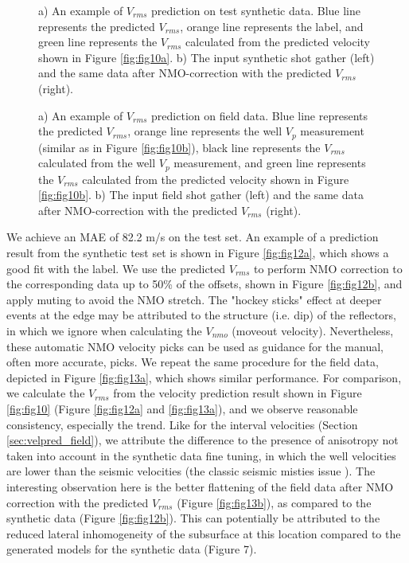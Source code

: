 \documentclass{article}
\begin{document}
\begin{figure}[h]
    \centering
    \caption{a) An example of $V_{rms}$ prediction on test synthetic data. Blue line represents the predicted $V_{rms}$, orange line represents the label, and green line represents the $V_{rms}$ calculated from the predicted velocity shown in Figure \ref{fig:fig10a}. b) The input synthetic shot gather (left) and the same data after NMO-correction with the predicted $V_{rms}$ (right).}
    \label{fig:fig12}
\end{figure}

\begin{figure}[h]
    \centering
    \caption{a) An example of $V_{rms}$ prediction on field data. Blue line represents the predicted $V_{rms}$, orange line represents the well $V_p$ measurement (similar as in Figure \ref{fig:fig10b}), black line represents the $V_{rms}$ calculated from the well $V_p$ measurement, and green line represents the $V_{rms}$ calculated from the predicted velocity shown in Figure \ref{fig:fig10b}. b) The input field shot gather (left) and the same data after NMO-correction with the predicted $V_{rms}$ (right).}
    \label{fig:fig13}
\end{figure}

We achieve an MAE of 82.2 m/s on the test set. An example of a prediction result from the synthetic test set is shown in Figure \ref{fig:fig12a}, which shows a good fit with the label. We use the predicted $V_{rms}$ to perform NMO correction to the corresponding data up to 50\% of the offsets, shown in Figure \ref{fig:fig12b}, and apply muting to avoid the NMO stretch. The "hockey sticks" effect at deeper events at the edge may be attributed to the structure (i.e. dip) of the reflectors, in which we ignore when calculating the $V_{nmo}$ (moveout velocity). Nevertheless, these automatic NMO velocity picks can be used as guidance for the manual, often more accurate, picks. We repeat the same procedure for the field data, depicted in Figure \ref{fig:fig13a}, which shows similar performance. For comparison, we calculate the $V_{rms}$ from the velocity prediction result shown in Figure \ref{fig:fig10} (Figure \ref{fig:fig12a} and \ref{fig:fig13a}), and we observe reasonable consistency, especially the trend. Like for the interval velocities (Section \ref{sec:velpred_field}), we attribute the difference to the presence of anisotropy not taken into account in the synthetic data fine tuning, in which the well velocities are lower than the seismic velocities (the classic seismic misties issue \cite{li2018using}). The interesting observation here is the better flattening of the field data after NMO correction with the predicted $V_{rms}$ (Figure \ref{fig:fig13b}), as compared to the synthetic data (Figure \ref{fig:fig12b}). This can potentially be attributed to the reduced lateral inhomogeneity of the subsurface at this location compared to the generated models for the synthetic data (Figure 7).
\end{document}
